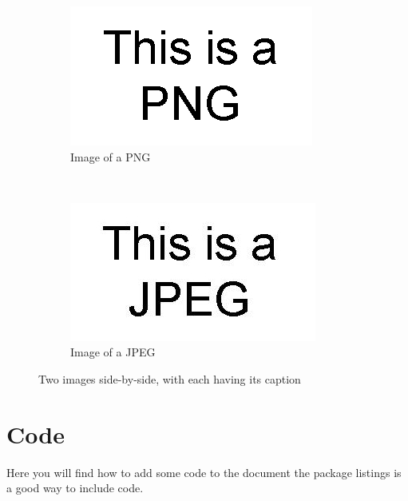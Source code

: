 \documentclass[12pt, a4paper,twoside]{article}
\begin{document}
\begin{figure}[ht]
\centering
        \begin{subfigure}[b]{0.4\textwidth}
                \centering
                \includegraphics[width=\textwidth]{figs/fig1}
                \caption{Image of a PNG}
                \label{fig:PNG}
        \end{subfigure}%
        ~ %
        \begin{subfigure}[b]{0.4\textwidth}
                \centering
                \includegraphics[width=\textwidth]{figs/fig2}
                \caption{Image of a JPEG}
                \label{fig:Jpeg}
        \end{subfigure}
        \caption{Two images side-by-side, with each having its caption}\label{fig:imagesside}
\end{figure}

\section{Code}
Here you will find how to add some code to the document
the package listings is  a good way to include code.
\end{document}
